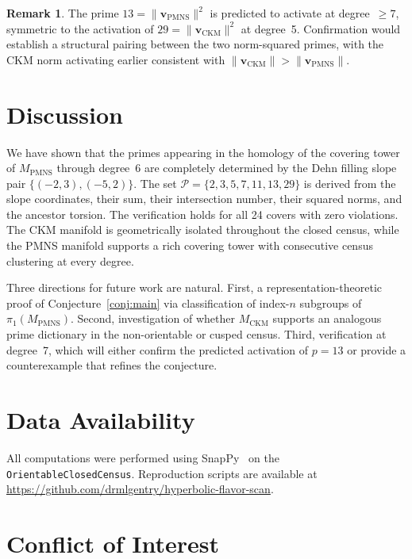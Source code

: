 \documentclass[12pt]{article}
\theoremstyle{definition}
\newtheorem{remark}[theorem]{Remark}
\begin{document}
\begin{remark}
The prime $13 = \|\mathbf{v}_{\mathrm{PMNS}}\|^2$ is predicted to
activate at degree~$\geq 7$, symmetric to the activation of
$29 = \|\mathbf{v}_{\mathrm{CKM}}\|^2$ at degree~5. Confirmation would
establish a structural pairing between the two norm-squared primes,
with the CKM norm activating earlier consistent with
$\|\mathbf{v}_{\mathrm{CKM}}\| > \|\mathbf{v}_{\mathrm{PMNS}}\|$.
\end{remark}

\section{Discussion}
\label{sec:conclusion}

We have shown that the primes appearing in the homology of the covering
tower of $M_{\mathrm{PMNS}}$ through degree~6 are completely determined
by the Dehn filling slope pair $\{(-2,3),(-5,2)\}$. The set
$\mathcal{P} = \{2,3,5,7,11,13,29\}$ is derived from the slope
coordinates, their sum, their intersection number, their squared norms,
and the ancestor torsion. The verification holds for all 24 covers with
zero violations. The CKM manifold is geometrically isolated throughout
the closed census, while the PMNS manifold supports a rich covering
tower with consecutive census clustering at every degree.

Three directions for future work are natural. First, a
representation-theoretic proof of Conjecture~\ref{conj:main} via
classification of index-$n$ subgroups of $\pi_1(M_{\mathrm{PMNS}})$.
Second, investigation of whether $M_{\mathrm{CKM}}$ supports an
analogous prime dictionary in the non-orientable or cusped census.
Third, verification at degree~7, which will either confirm the predicted
activation of $p = 13$ or provide a counterexample that refines the
conjecture.

\section*{Data Availability}

All computations were performed using SnapPy~\cite{SnapPy}
on the \texttt{OrientableClosedCensus}. Reproduction scripts are
available at
\url{https://github.com/drmlgentry/hyperbolic-flavor-scan}.

\section*{Conflict of Interest}
\end{document}
